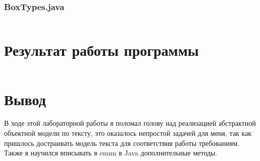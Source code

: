\documentclass[11pt]{article}
\begin{document}
\subsubsection{BoxTypes.java}
\inputminted{java}{../prog3lab/src/main/java/com/kupp/prog3lab/BoxTypes.java}
\section{Результат работы программы}
\inputminted{text}{../out.txt}
\section{Вывод}
\large
В ходе этой лабораторной работы я поломал голову над реализацией абстрактной объектной модели по тексту, это оказалось непростой задачей для меня, так как пришлось достраивать модель текста для соответствия работы требованиям. Также я научился вписывать в enum в Java дополнительные методы.
\end{document}
